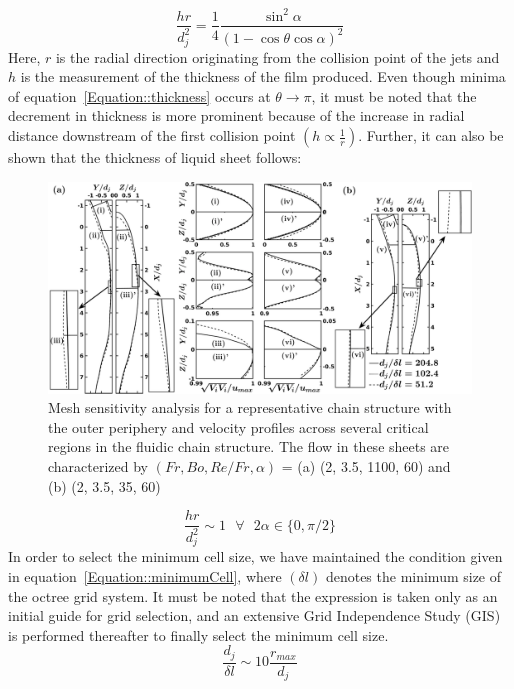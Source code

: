 \begin{equation}\label{Equation::thickness}
\frac{hr}{d_j^2} = \frac{1}{4}\frac{\sin^2\alpha}{(1-\cos\theta\cos\alpha)^2}
\end{equation} 
Here, $r$ is the radial direction originating from the collision point of the jets and $h$ is the measurement of the thickness of the film produced. Even though minima of equation~\ref{Equation::thickness} occurs at $\theta \to \pi$, it must be noted that the decrement in thickness is more prominent because of the increase in radial distance downstream of the first collision point $\left(h \propto \frac{1}{r}\right)$. Further, it can also be shown that the thickness of liquid sheet follows:
\begin{figure}
	\centering
	\includegraphics[width=\textwidth]{chapters/jetJet/GISThesis}
	\caption{Mesh sensitivity analysis for a representative chain structure with the outer periphery and velocity profiles across several critical regions in the fluidic chain structure. The flow in these sheets are characterized by $\left(Fr, Bo, Re/Fr, \alpha\right)$ = (a) (2, 3.5, 1100, 60\degree) and (b) (2, 3.5, 35, 60\degree)}
	\label{Figure::gisetal2}
\end{figure}
\begin{equation}
\frac{hr}{d_j^2} \sim 1\:\:\:\forall\:\:\:2\alpha \in \{0,\pi/2\}
\end{equation}
In order to select the minimum cell size, we have maintained the condition given in equation~\ref{Equation::minimumCell}, where $\left(\delta l\right)$ denotes the minimum size of the octree grid system. It must be noted that the expression is taken only as an initial guide for grid selection, and an extensive Grid Independence Study (GIS) is performed thereafter to finally select the minimum cell size.
\begin{equation}\label{Equation::minimumCell}
\frac{d_j}{\delta l} \sim 10\frac{r_{max}}{d_j}
\end{equation}
